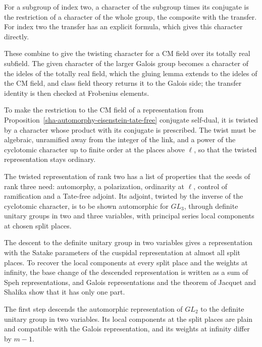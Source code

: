 For a subgroup of index two, a character of the subgroup times its conjugate is the restriction of a character of the whole group, the composite with the transfer. For index two the transfer has an explicit formula, which gives this character directly.

These combine to give the twisting character for a CM field over its totally real subfield. The given character of the larger Galois group becomes a character of the ideles of the totally real field, which the gluing lemma extends to the ideles of the CM field, and class field theory returns it to the Galois side; the transfer identity is then checked at Frobenius elements.

To make the restriction to the CM field of a representation from Proposition~\ref{sha-automorphy-eisenstein-tate-free} conjugate self-dual, it is twisted by a character whose product with its conjugate is prescribed. The twist must be algebraic, unramified away from the integer of the link, and a power of the cyclotomic character up to finite order at the places above $\ell$, so that the twisted representation stays ordinary.

The twisted representation of rank two has a list of properties that the seeds of rank three need: automorphy, a polarization, ordinarity at $\ell$, control of ramification and a Tate-free adjoint. Its adjoint, twisted by the inverse of the cyclotomic character, is to be shown automorphic for $GL_3$, through definite unitary groups in two and three variables, with principal series local components at chosen split places.

The descent to the definite unitary group in two variables gives a representation with the Satake parameters of the cuspidal representation at almost all split places. To recover the local components at every split place and the weights at infinity, the base change of the descended representation is written as a sum of Speh representations, and Galois representations and the theorem of Jacquet and Shalika show that it has only one part.

The first step descends the automorphic representation of $GL_2$ to the definite unitary group in two variables. Its local components at the split places are plain and compatible with the Galois representation, and its weights at infinity differ by $m-1$.


